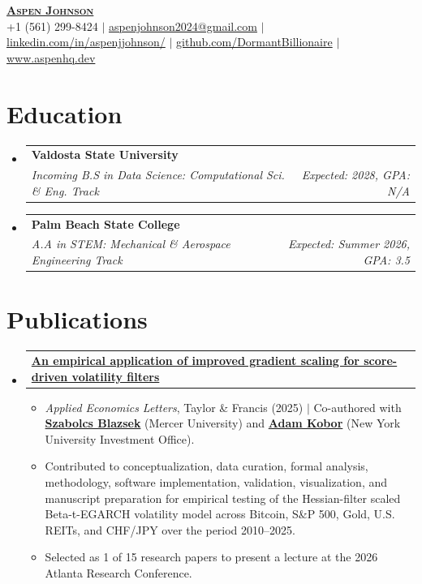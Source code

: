 \documentclass[letterpaper,11.000000001 pt]{article}
\makeatletter
\newcommand{\resumeItem}[1]{
  \item\small{
    {#1 \vspace{-1pt}}
  }
}
\newcommand{\resumeProjectHeading}[2]{
    \item
    \begin{tabular*}{0.97\textwidth}{l@{\extracolsep{\fill}}r}
      \small#1 & #2 \\
    \end{tabular*}\vspace{-6pt}
}
\newcommand{\resumeEducationEntry}[3]{
  \vspace{-2pt}\item
    \begin{tabular*}{0.97\textwidth}[t]{l@{\extracolsep{\fill}}r}
      \textbf{#1} & \\
      \textit{\small#2} & \textit{\small #3} \hfill
    \end{tabular*}\vspace{-4pt}
}
\newcommand{\resumeSubHeadingListStart}{\begin{itemize}[leftmargin=0.15in, label={}]}
\newcommand{\resumeSubHeadingListEnd}{\end{itemize}}
\newcommand{\resumeItemListStart}{\begin{itemize}}
\newcommand{\resumeItemListEnd}{\end{itemize}\vspace{-5pt}}
\makeatother
\begin{document}

\begin{center}
    \textbf{\Huge \scshape \underline{Aspen Johnson}} \\ \vspace{5pt}
    \small +1 (561) 299-8424 $|$ \href{mailto:aspenjohnson2024@gmail.com}{aspenjohnson2024@gmail.com} $|$
    \href{https://www.linkedin.com/in/aspenjjohnson/}{linkedin.com/in/aspenjjohnson/} $|$
    \href{https://github.com/DormantBillionaire}{github.com/DormantBillionaire} $|$
    \href{https://www.aspenhq.dev/}{www.aspenhq.dev}
\end{center}


\section{Education}
  \resumeSubHeadingListStart
    \resumeEducationEntry
      {Valdosta State University}
      {Incoming B.S in Data Science: Computational Sci. \& Eng. Track}
      {Expected: 2028, GPA: N/A}

    \resumeEducationEntry
      {Palm Beach State College}
      {A.A in STEM: Mechanical \& Aerospace Engineering Track}
      {Expected: Summer 2026, GPA: 3.5}
  \resumeSubHeadingListEnd
  
\section{Publications}
  \resumeSubHeadingListStart
    \resumeProjectHeading
      {\href{https://www.tandfonline.com/doi/full/10.1080/13504851.2025.2606928}{\textbf{An empirical application of improved gradient scaling for score-driven volatility filters}}}{}
    \resumeItemListStart
      \resumeItem{\textit{Applied Economics Letters}, Taylor \& Francis (2025) $|$ Co-authored with \href{https://business.mercer.edu/faculty-and-insights/faculty-directory/dr-szabolcs-blazsek/}{\textbf{Szabolcs Blazsek}} (Mercer University) and \href{https://www.linkedin.com/in/adamkobor/}{\textbf{Adam Kobor}} (New York University Investment Office).}
      \resumeItem{Contributed to conceptualization, data curation, formal analysis, methodology, software implementation, validation, visualization, and manuscript preparation for empirical testing of the Hessian-filter scaled Beta-t-EGARCH volatility model across Bitcoin, S\&P 500, Gold, U.S. REITs, and CHF/JPY over the period 2010--2025.}
      \resumeItem{Selected as 1 of 15 research papers to present a lecture at the 2026 Atlanta Research Conference.}
      \resumeItemListEnd
  \resumeSubHeadingListEnd
\end{document}
